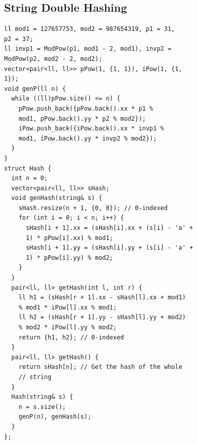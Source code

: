 \subsection{String Double Hashing}
\begin{verbatim}
ll mod1 = 127657753, mod2 = 987654319, p1 = 31,
p2 = 37;
ll invp1 = ModPow(p1, mod1 - 2, mod1), invp2 =
ModPow(p2, mod2 - 2, mod2);
vector<pair<ll, ll>> pPow(1, {1, 1}), iPow(1, {1,
1});
void genP(ll n) {
  while ((ll)pPow.size() <= n) {
    pPow.push_back({pPow.back().xx * p1 %
    mod1, pPow.back().yy * p2 % mod2});
    iPow.push_back({iPow.back().xx * invp1 %
    mod1, iPow.back().yy * invp2 % mod2});
  }
}
struct Hash {
  int n = 0;
  vector<pair<ll, ll>> sHash;
  void genHash(string& s) {
    sHash.resize(n + 1, {0, 0}); // 0-indexed
    for (int i = 0; i < n; i++) {
      sHash[i + 1].xx = (sHash[i].xx + (s[i] - 'a' +
      1) * pPow[i].xx) % mod1;
      sHash[i + 1].yy = (sHash[i].yy + (s[i] - 'a' +
      1) * pPow[i].yy) % mod2;
    }
  }
  pair<ll, ll> getHash(int l, int r) {
    ll h1 = (sHash[r + 1].xx - sHash[l].xx + mod1)
    % mod1 * iPow[l].xx % mod1;
    ll h2 = (sHash[r + 1].yy - sHash[l].yy + mod2)
    % mod2 * iPow[l].yy % mod2;
    return {h1, h2}; // 0-indexed
  }
  pair<ll, ll> getHash() {
    return sHash[n]; // Get the hash of the whole
    // string
  }
  Hash(string& s) {
    n = s.size();
    genP(n), genHash(s);
  }
};
\end{verbatim}
